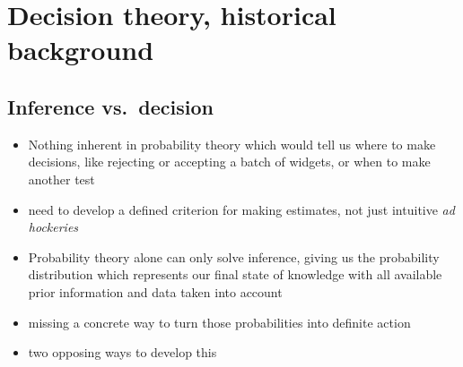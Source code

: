 \documentclass[../jaynes_prob_theory_notes.tex]{subfiles}
\begin{document}
    \section{Decision theory, historical background}
        \subsection{Inference vs.\ decision}
            \begin{itemize} 
                \item Nothing inherent in probability theory which would tell us where to make decisions, like rejecting or accepting a batch of widgets, or when to make another test
                \item need to develop a defined criterion for making estimates, not just intuitive \textit{ad hockeries}
                \item Probability theory alone can only solve inference, giving us the probability distribution which represents our final state of knowledge with all available prior information and data taken into account
                \item missing a concrete way to turn those probabilities into definite action
                \item two opposing ways to develop this
            \end{itemize}
\end{document}
